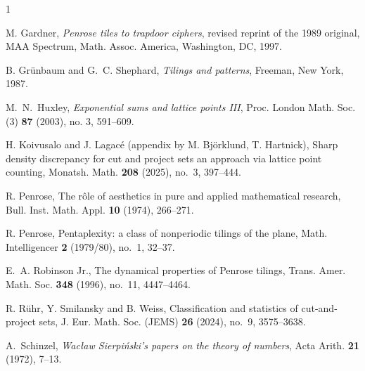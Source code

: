 \documentclass[reqno]{amsart}
\begin{document}
\begin{thebibliography}{1}
\vspace*{.1in}

M. Gardner, {\it Penrose tiles to trapdoor ciphers}, revised reprint of the 1989 original, 
MAA Spectrum, Math. Assoc. America, Washington, DC, 1997.

\vspace*{.1in}

B. Gr\"unbaum and G.~C. Shephard, {\it Tilings and patterns}, Freeman, New York, 1987.

\vspace*{.1in}

M.~N.~Huxley, {\em Exponential sums and lattice points III},
Proc. London Math. Soc. (3)  {\bf 87}  (2003),  no. 3, 591--609.

\vspace*{.1in}

H. Koivusalo and J. Lagac\'e (appendix by M. Bj\"orklund, T. Hartnick), Sharp density discrepancy for cut and project sets an approach via lattice point counting, Monatsh. Math. {\bf 208} (2025), no.~3, 397--444.

\vspace*{.1in}

R. Penrose, The r\^{o}le of aesthetics in pure and applied mathematical research, Bull. Inst. Math. Appl. {\bf 10} (1974), 266--271.

\vspace*{.1in}

R. Penrose, Pentaplexity: a class of nonperiodic tilings of the plane, Math. Intelligencer {\bf 2} (1979/80), no.~1, 32--37.

\vspace*{.1in}

E.~A. Robinson Jr., The dynamical properties of Penrose tilings, Trans. Amer. Math. Soc. {\bf 348} (1996), no.~11, 4447--4464.

\vspace*{.1in}

R. R\"uhr, Y. Smilansky and B. Weiss, Classification and statistics of cut-and-project sets, J. Eur. Math. Soc. (JEMS) {\bf 26} (2024), no.~9, 3575--3638.

\vspace*{.1in}

A.~Schinzel, {\em Wac\l{}aw Sierpi\'{n}ski's papers on the theory of numbers},
Acta Arith.  {\bf 21}  (1972), 7--13.


\end{thebibliography}
\end{document}
